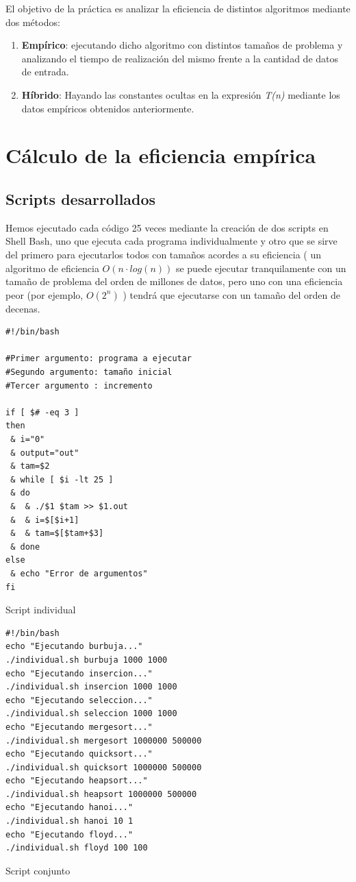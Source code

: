 \documentclass[12pt,spanish]{article}
\begin{document}
El objetivo de la práctica es analizar la eficiencia de distintos algoritmos mediante dos métodos:
\begin{enumerate}
\item \textbf{Empírico}: ejecutando dicho algoritmo con distintos tamaños de problema y analizando el tiempo de realización del mismo frente a la cantidad de datos de entrada.
\item \textbf{Híbrido}: Hayando las constantes ocultas en la expresión \textit{T(n)} mediante los datos empíricos obtenidos anteriormente.
\end{enumerate}

\section{Cálculo de la eficiencia empírica}
\subsection{Scripts desarrollados}
Hemos ejecutado cada código 25 veces mediante la creación de dos scripts en Shell Bash, uno que ejecuta cada programa individualmente y otro que se sirve del primero para ejecutarlos todos con tamaños acordes a su eficiencia ( un algoritmo de eficiencia $O(n \cdot log(n))$ se puede ejecutar tranquilamente con un tamaño de problema del orden de millones de datos, pero uno con una eficiencia peor (por ejemplo, $O(2^n)$ ) tendrá que ejecutarse con un tamaño del orden de decenas.
\begin{listing}[H]
\begin{verbatim}
#!/bin/bash

#Primer argumento: programa a ejecutar
#Segundo argumento: tamaño inicial
#Tercer argumento : incremento

if [ $# -eq 3 ]
then
 & i="0"
 & output="out"
 & tam=$2
 & while [ $i -lt 25 ]
 & do
 &  & ./$1 $tam >> $1.out
 &  & i=$[$i+1]
 &  & tam=$[$tam+$3]
 & done
else
 & echo "Error de argumentos"
fi
\end{verbatim}
\caption{Script individual}
\end{listing}
\newpage

\begin{listing}[H]
\begin{verbatim}
#!/bin/bash
echo "Ejecutando burbuja..."
./individual.sh burbuja 1000 1000
echo "Ejecutando insercion..."
./individual.sh insercion 1000 1000
echo "Ejecutando seleccion..."
./individual.sh seleccion 1000 1000
echo "Ejecutando mergesort..."
./individual.sh mergesort 1000000 500000
echo "Ejecutando quicksort..."
./individual.sh quicksort 1000000 500000
echo "Ejecutando heapsort..."
./individual.sh heapsort 1000000 500000
echo "Ejecutando hanoi..."
./individual.sh hanoi 10 1
echo "Ejecutando floyd..."
./individual.sh floyd 100 100
\end{verbatim}
\caption{Script conjunto}
\end{listing}
\end{document}
